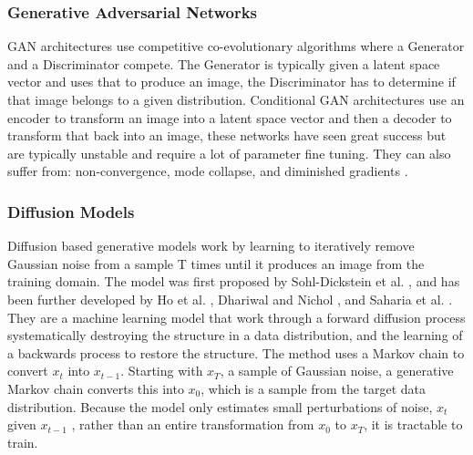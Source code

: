 \documentclass{UoYCSproject}
\begin{document}
\subsubsection{Generative Adversarial Networks}





GAN architectures\cite{goodfellow2014generative} use competitive co-evolutionary algorithms where a Generator and a Discriminator compete. The Generator is typically given a latent space vector and uses that to produce an image, the Discriminator has to determine if that image belongs to a given distribution. Conditional GAN architectures use an encoder to transform an image into a latent space vector and then a decoder to transform that back into an image, these networks have seen great success \cite{zhu2020unpaired, karras2019stylebased, isola2018imagetoimage} but are typically unstable and require a lot of parameter fine tuning. They can also suffer from: non-convergence, mode collapse, and diminished gradients \cite{goodfellow2017nips}.

\subsubsection{Diffusion Models}


Diffusion based generative models work by learning to iteratively remove Gaussian noise from a sample T times until it produces an image from the training domain. The model was first proposed by Sohl-Dickstein et al. \cite{sohldickstein2015deep}, and has been further developed by Ho et al. \cite{ho2020denoising},  Dhariwal and Nichol \cite{dhariwal2021diffusion}, and Saharia et al. \cite{saharia2022palette}. They are a machine learning model that work through a forward diffusion process systematically destroying the structure in a data distribution, and the learning of a backwards process to restore the structure. The method uses a Markov chain to convert $ x_t $ into $ x_{t-1} $. Starting with $ x_T $, a sample of Gaussian noise, a generative Markov chain converts this into $ x_0 $, which is a sample from the target data distribution. Because the model only estimates small perturbations of noise, $ x_t $ given $ x_{t-1} $ , rather than an entire transformation from $ x_0 $ to $ x_T $, it is tractable to train. 
\end{document}
